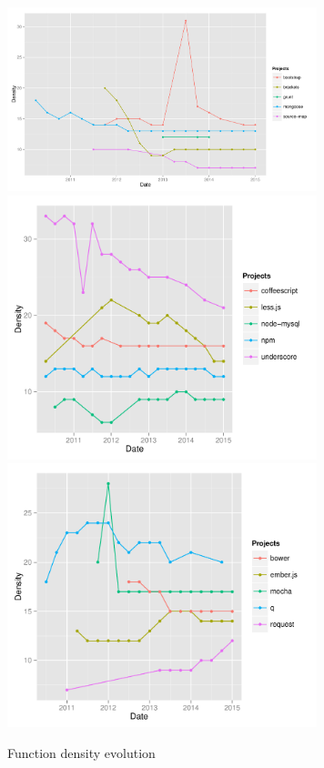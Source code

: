  \begin{figure}[thb!]
 	\caption{Function density evolution}
 	\label{fig:function_density}
 	\includegraphics[width=90mm,scale=0.5]{figures/function_density}
 	\includegraphics[width=90mm,scale=0.5]{figures/function_density_2}
 	\includegraphics[width=90mm,scale=0.5]{figures/function_density_3}
 \end{figure}

\vspace{3 mm}
\noindent{\rqiii}
\vspace{3 mm}

